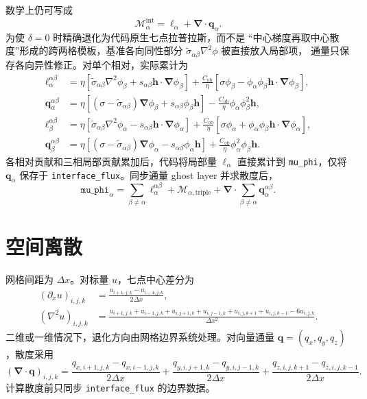 \documentclass[UTF8,a4paper,11pt]{ctexart}
\newcommand{\grad}{\bm{\nabla}}
\newcommand{\diver}{\bm{\nabla}\!\cdot}
\newcommand{\vct}[1]{\bm{#1}}
\begin{document}
数学上仍可写成
\begin{equation}
 \mathcal M_\alpha^{\mathrm{int}}
 =\ell_\alpha+\diver\vct q_\alpha.
\end{equation}
为使 \(\delta=0\) 时精确退化为代码原生七点拉普拉斯，而不是
“中心梯度再取中心散度”形成的跨两格模板，基准各向同性部分
\(\widetilde\sigma_{\alpha\beta}\nabla^2\phi\) 被直接放入局部项，
通量只保存各向异性修正。对单个相对，实际累计为
\begin{align}
 \ell_\alpha^{\alpha\beta}
 &=\eta\left[
 \widetilde\sigma_{\alpha\beta}\nabla^2\phi_\beta
 +s_{\alpha\beta}\vct h\cdot\grad\phi_\beta
 \right]
 +\frac{C_{\mathrm{ob}}}{\eta}\left[
 \sigma\phi_\beta
 -\phi_\alpha\phi_\beta\vct h\cdot\grad\phi_\beta
 \right],\\
 \vct q_\alpha^{\alpha\beta}
 &=\eta\left[
 (\sigma-\widetilde\sigma_{\alpha\beta})\grad\phi_\beta
 +s_{\alpha\beta}\phi_\beta\vct h
 \right]
 -\frac{C_{\mathrm{ob}}}{\eta}
 \phi_\alpha\phi_\beta^2\vct h,\\
 \ell_\beta^{\alpha\beta}
 &=\eta\left[
 \widetilde\sigma_{\alpha\beta}\nabla^2\phi_\alpha
 -s_{\alpha\beta}\vct h\cdot\grad\phi_\alpha
 \right]
 +\frac{C_{\mathrm{ob}}}{\eta}\left[
 \sigma\phi_\alpha
 +\phi_\alpha\phi_\beta\vct h\cdot\grad\phi_\alpha
 \right],\\
 \vct q_\beta^{\alpha\beta}
 &=\eta\left[
 (\sigma-\widetilde\sigma_{\alpha\beta})\grad\phi_\alpha
 -s_{\alpha\beta}\phi_\alpha\vct h
 \right]
 +\frac{C_{\mathrm{ob}}}{\eta}
 \phi_\alpha^2\phi_\beta\vct h.
\end{align}
各相对贡献和三相局部贡献累加后，代码将局部量 \(\ell_\alpha\)
直接累计到 \texttt{mu\_phi}，仅将 \(\vct q_\alpha\) 保存于
\texttt{interface\_flux}。同步通量 ghost layer 并求散度后，
\[
 \texttt{mu\_phi}_\alpha
 =\sum_{\beta\ne\alpha}\ell_\alpha^{\alpha\beta}
 +\mathcal M_{\alpha,\mathrm{triple}}
 +\diver\sum_{\beta\ne\alpha}\vct q_\alpha^{\alpha\beta}.
\]

\section{空间离散}

网格间距为 \(\Delta x\)。对标量 \(u\)，七点中心差分为
\begin{align}
 (\partial_x u)_{i,j,k}
 &=\frac{u_{i+1,j,k}-u_{i-1,j,k}}{2\Delta x},\\
 (\nabla^2u)_{i,j,k}
 &=\frac{
 u_{i+1,j,k}+u_{i-1,j,k}
 +u_{i,j+1,k}+u_{i,j-1,k}
 +u_{i,j,k+1}+u_{i,j,k-1}
 -6u_{i,j,k}}{\Delta x^2}.
\end{align}
二维或一维情况下，退化方向由网格边界系统处理。对向量通量
\(\vct q=(q_x,q_y,q_z)\)，散度采用
\begin{equation}
 (\diver\vct q)_{i,j,k}
 =\frac{q_{x,i+1,j,k}-q_{x,i-1,j,k}}{2\Delta x}
 +\frac{q_{y,i,j+1,k}-q_{y,i,j-1,k}}{2\Delta x}
 +\frac{q_{z,i,j,k+1}-q_{z,i,j,k-1}}{2\Delta x}.
\end{equation}
计算散度前只同步 \texttt{interface\_flux} 的边界数据。
\end{document}
